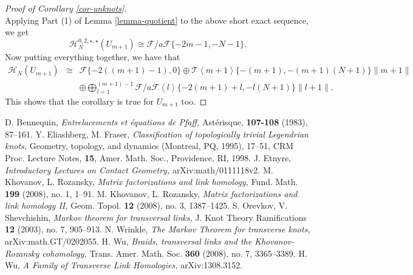 \documentclass{amsart}
\theoremstyle{plain}
\theoremstyle{definition}
\theoremstyle{remark}
\numberwithin{equation}{section}
\begin{document}
\begin{proof}[Proof of Corollary \ref{cor-unknots}]
\[\]
Applying Part (1) of Lemma \ref{lemma-quotient} to the above short exact sequence, we get 
\[
{\mathcal{H}}_N^{0,2,\star,\star}(U_{m+1}) \cong \mathcal{F}/a \mathcal{F} \{-2m-1,-N-1\}. 
\]
Now putting everything together, we have that 
\begin{eqnarray*}
{\mathcal{H}}_N(U_{m+1}) & \cong & \mathcal{F} \{-2((m+1)-1),0\} \oplus \mathcal{T} \left\langle m+1 \right\rangle \{-(m+1), -(m+1)(N+1)\}\|m+1\| \\ 
&& \oplus \bigoplus_{l=1}^{(m+1)-1} \mathcal{F}/a\mathcal{F} \left\langle l \right\rangle \{-2(m+1)+l, -l(N+1)\}\|l+1\|.
\end{eqnarray*}
This shows that the corollary is true for $U_{m+1}$ too.
\end{proof}

\begin{thebibliography}{99}
  
   D. Bennequin,
   \textit{Entrelacements et \'{e}quations de Pfaff,}
   Ast\'{e}risque, \textbf{107-108} (1983), 87--161.
   Y. Eliashberg, M. Fraser,
   \textit{Classification of topologically trivial Legendrian knots,}
   Geometry, topology, and dynamics (Montreal, PQ, 1995), 17--51, CRM Proc. Lecture Notes, \textbf{15}, Amer. Math. Soc., Providence, RI, 1998.
   J. Etnyre,
   \textit{Introductory Lectures on Contact Geometry,}
   arXiv:math/0111118v2.
   M. Khovanov, L. Rozansky,
   \emph{Matrix factorizations and link homology,}
   Fund. Math. \textbf{199} (2008), no. 1, 1--91.
   M. Khovanov, L. Rozansky,
   \emph{Matrix factorizations and link homology II,}
   Geom. Topol. \textbf{12} (2008), no. 3, 1387--1425.
   S. Orevkov, V. Shevchishin,
   \textit{Markov theorem for transversal links,}
   J. Knot Theory Ramifications \textbf{12} (2003), no. 7, 905--913.
   N. Wrinkle,
   \textit{The Markov Theorem for transverse knots,}
   arXiv:math.GT/0202055.
   H. Wu,
   \emph{Braids, transversal links and the Khovanov-Rozansky cohomology,}
    Trans. Amer. Math. Soc. \textbf{360} (2008), no. 7, 3365--3389.
   H. Wu,
   \emph{A Family of Transverse Link Homologies,}
   arXiv:1308.3152.
\end{thebibliography}
\end{document}

